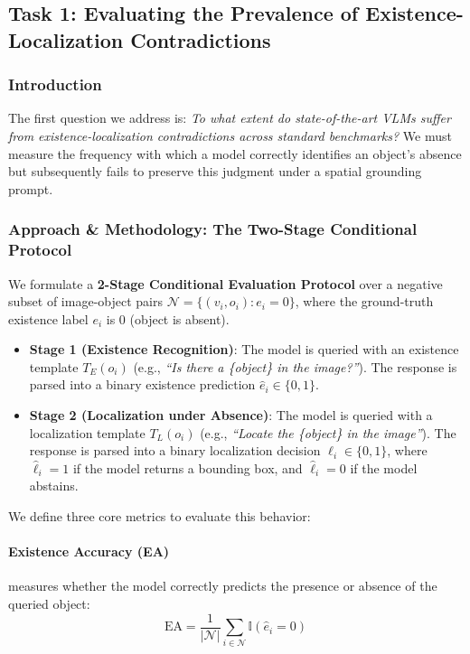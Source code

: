 \documentclass[12pt,a4paper]{article}
\begin{document}
\subsection{Task 1: Evaluating the Prevalence of Existence-Localization Contradictions}

\subsubsection{Introduction}
The first question we address is: \textit{To what extent do state-of-the-art VLMs suffer from existence-localization contradictions across standard benchmarks?} We must measure the frequency with which a model correctly identifies an object's absence but subsequently fails to preserve this judgment under a spatial grounding prompt.

\subsubsection{Approach \& Methodology: The Two-Stage Conditional Protocol}
We formulate a \textbf{2-Stage Conditional Evaluation Protocol} over a negative subset of image-object pairs $\mathcal{N} = \{(v_i, o_i) : e_i = 0\}$, where the ground-truth existence label $e_i$ is 0 (object is absent).

\begin{itemize}[leftmargin=*]
\item \textbf{Stage 1 (Existence Recognition)}: The model is queried with an existence template $T_E(o_i)$ (e.g., \textit{``Is there a \{object\} in the image?''}). The response is parsed into a binary existence prediction $\hat{e}_i \in \{0, 1\}$.
\item \textbf{Stage 2 (Localization under Absence)}: The model is queried with a localization template $T_L(o_i)$ (e.g., \textit{``Locate the \{object\} in the image''}). The response is parsed into a binary localization decision $\hat{\ell}_i \in \{0, 1\}$, where $\hat{\ell}_i = 1$ if the model returns a bounding box, and $\hat{\ell}_i = 0$ if the model abstains.
\end{itemize}

We define three core metrics to evaluate this behavior:

\paragraph{Existence Accuracy (EA)} measures whether the model correctly predicts the presence or absence of the queried object:
\begin{equation}
\text{EA} = \frac{1}{|\mathcal{N}|} \sum_{i \in \mathcal{N}} \mathbb{I}(\hat{e}_i = 0)
\end{equation}
\end{document}
